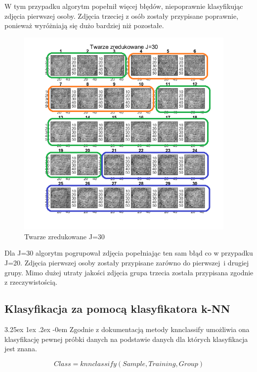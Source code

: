 \documentclass[11pt, a4paper]{article}
\makeatletter
\newcommand{\fbi}{\leavevmode{\parindent=1em\indent}}
\renewcommand\paragraph{\@startsection{paragraph}{5}{\z@}
  {3.25ex \@plus1ex \@minus.2ex}
  {-0em}
  {\normalfont\normalsize\bfseries}}
\makeatother
\begin{document}
\fbi
W tym przypadku algorytm popełnił więcej błędów, niepoprawnie klasyfikując zdjęcia pierwszej osoby. Zdjęcia trzeciej z osób zostały przypisane poprawnie, ponieważ wyróżniają się dużo bardziej niż pozostałe.


\begin{figure}[H]
	\centering
	\includegraphics[width=0.95\textwidth]{./assets/ilustracja_zad2_redukcja_j30.png}
	\caption{Twarze zredukowane J=30}
	\label{fig:ilustracja_zad2_redukcja_j30}
\end{figure}

\fbi
Dla J=30 algorytm pogrupował zdjęcia popełniając ten sam błąd co w przypadku J=20. Zdjęcia pierwszej osoby zostały przypisane zarówno do pierwszej~i drugiej grupy. Mimo dużej utraty jakości zdjęcia grupa trzecia została przypisana zgodnie z rzeczywistością.

\subsection{Klasyfikacja za pomocą klasyfikatora k-NN}
\paragraph{}
Zgodnie z dokumentacją metody knnclassify \cite{test3} umożliwia ona klasyfikację pewnej próbki danych na podstawie danych dla których klasyfikacja jest znana.

\begin{equation}\label{eq:knnclasify}
Class = knnclassify(Sample, Training, Group)
\end{equation}
\end{document}
